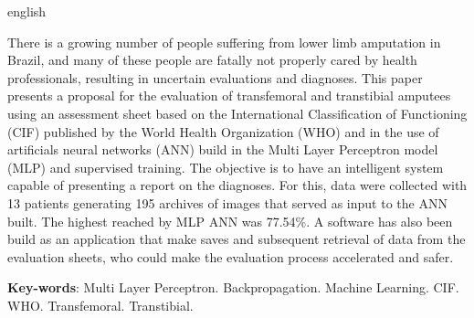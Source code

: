 \begin{resumo}[Abstract]
 \begin{otherlanguage*}{english}

   There is a growing number of people suffering from lower limb amputation in Brazil, and many of these people are fatally not properly cared by health professionals, resulting in uncertain evaluations and diagnoses. This paper presents a proposal for the evaluation of transfemoral and transtibial amputees using an assessment sheet based on the International Classification of Functioning (CIF) published by the World Health Organization (WHO) and in the use of artificials neural networks (ANN) build in the Multi Layer Perceptron model (MLP) and supervised training. The objective is to have an intelligent system capable of presenting a report on the diagnoses. For this, data were collected with 13 patients generating 195 archives of images that served as input to the ANN built. The highest reached by MLP ANN was 77.54\%. A software has also been build as an application that make saves and subsequent retrieval of data from the evaluation sheets, who could make the evaluation process accelerated and safer.

   \vspace{\onelineskip}

   \noindent
   \textbf{Key-words}: Multi Layer Perceptron. Backpropagation. Machine Learning. CIF. WHO. Transfemoral. Transtibial.
 \end{otherlanguage*}
\end{resumo}
